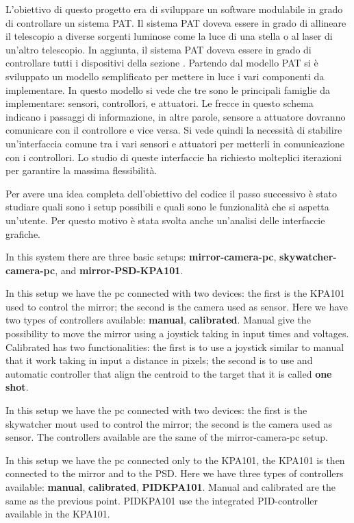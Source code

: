 L'obiettivo di questo progetto era di sviluppare un software modulabile in grado di controllare un sistema PAT. Il sistema PAT doveva essere in grado di allineare il telescopio a diverse sorgenti luminose come la luce di una stella o al laser di un'altro telescopio. In aggiunta, il sistema PAT doveva essere in grado di controllare tutti i dispositivi della sezione .
Partendo dal modello PAT  si è sviluppato un modello semplificato  per mettere in luce i vari componenti da implementare. In questo modello si vede che tre sono le principali famiglie da implementare: sensori, controllori, e attuatori. Le frecce in questo schema indicano i passaggi di informazione, in altre parole, sensore a attuatore dovranno comunicare con il controllore e vice versa. Si vede quindi la necessità di stabilire un'interfaccia comune tra i vari sensori e attuatori per metterli in comunicazione con i controllori. Lo studio di queste interfaccie ha richiesto molteplici iterazioni per garantire la massima flessibilità.

Per avere una idea completa dell'obiettivo del codice il passo successivo è stato studiare quali sono i setup possibili e quali sono le funzionalità che si aspetta un'utente. Per questo motivo è stata svolta anche un'analisi delle interfaccie grafiche.

In this system there are three basic setups:
\textbf{mirror-camera-pc}, \textbf{skywatcher-camera-pc}, and \textbf{mirror-PSD-KPA101}.

In this setup we have the pc connected with two devices: the first is
the KPA101 used to control the mirror; the second is the camera used as
sensor. Here we have two types of controllers available: \textbf{manual},
\textbf{calibrated}. Manual give the possibility to move the mirror using a joystick taking
in input times and voltages. Calibrated has two functionalities: the first is to use a joystick
similar to manual that it work taking in input a distance in pixels; the
second is to use and automatic controller that align the centroid to the
target that it is called \textbf{one shot}.

In this setup we have the pc connected with two devices: the first is
the skywatcher mout used to control the mirror; the second is the camera used as
sensor. The controllers available are the same of the mirror-camera-pc setup.

In this setup we have the pc connected only to the KPA101, the KPA101 is
then connected to the mirror and to the PSD. Here we have three types of controllers available: \textbf{manual}, \textbf{calibrated}, \textbf{PIDKPA101}. Manual and calibrated are the same as the previous point. PIDKPA101 use the integrated PID-controller available in the KPA101.





% 

